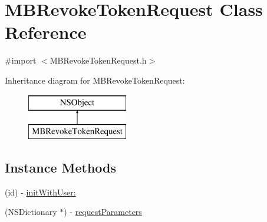 \hypertarget{interface_m_b_revoke_token_request}{\section{M\-B\-Revoke\-Token\-Request Class Reference}
\label{interface_m_b_revoke_token_request}
}


{\ttfamily \#import $<$M\-B\-Revoke\-Token\-Request.\-h$>$}

Inheritance diagram for M\-B\-Revoke\-Token\-Request\-:\begin{figure}[H]
\begin{center}
\leavevmode
\includegraphics[height=2.000000cm]{interface_m_b_revoke_token_request}
\end{center}
\end{figure}
\subsection*{Instance Methods}
\begin{DoxyCompactItemize}
\item 
(id) -\/ \hyperlink{interface_m_b_revoke_token_request_a1c852f7b677ae2b465e87d499405c773}{init\-With\-User\-:}
\item 
(N\-S\-Dictionary $\ast$) -\/ \hyperlink{interface_m_b_revoke_token_request_a4d3c7a419dcb0f78e0ba7d834f70386f}{request\-Parameters}
\end{DoxyCompactItemize}


